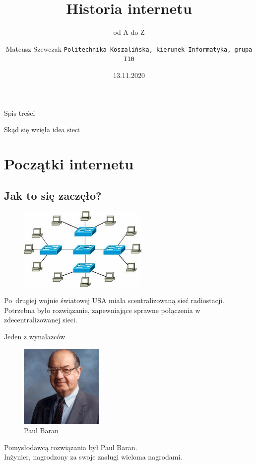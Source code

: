 \documentclass{beamer}
\title{Historia internetu}
\subtitle{od A do Z}
\author[Mateusz Szewczak]{Mateusz Szewczak
	\texttt{Politechnika Koszalińska, kierunek Informatyka, grupa I10}}
\date[Koszalin 2020]{13.11.2020}
\begin{document}
	
	\begin{frame}
		\maketitle
	\end{frame}
	\begin{frame}{Spis treści}
		\tableofcontents
	\end{frame}
	\begin{frame}{Skąd się wzięła idea sieci}
		\section{Początki internetu}
		\subsection{Jak to się zaczęło?}
		\begin{figure}
			\flushright
			\vspace{-30pt}
			\includegraphics[height=4cm]{gwiazda.jpg}
			\caption{\cite{SOISK.PL}}
		\end{figure}
		Po~drugiej wojnie światowej USA miała scentralizowaną sieć radiostacji. Potrzebna było rozwiązanie, zapewniające sprawne połączenia w zdecentralizowanej sieci.
		\nocite{hist:int:wiki}
	\end{frame}
	\begin{frame}{Jeden z wynalazców}
		\begin{figure}
			\flushright
			\vspace{-30pt}
			\includegraphics[height=4cm]{baran-zdjecie.jpg}
			\\Paul Baran
		\end{figure}
		Pomysłodawcą rozwiązania był Paul Baran. \\
		Inżynier, nagrodzony za swoje zasługi wieloma nagrodami. \nocite{ojciec:internetu}
	\end{frame}
\end{document}
